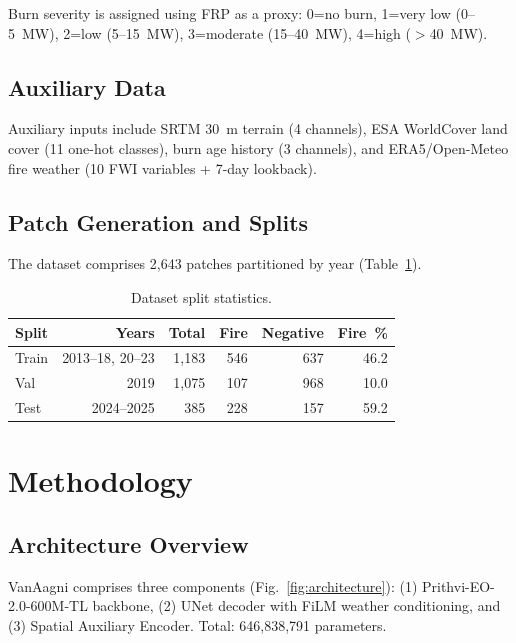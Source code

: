 \documentclass[review,12pt]{elsarticle}
\begin{document}
Burn severity is assigned using FRP as a proxy: 0=no burn, 1=very low (0--5~MW), 2=low (5--15~MW), 3=moderate (15--40~MW), 4=high ($>$40~MW).

\subsection{Auxiliary Data}

Auxiliary inputs include SRTM 30~m terrain (4 channels), ESA WorldCover land cover (11 one-hot classes), burn age history (3 channels), and ERA5/Open-Meteo fire weather (10 FWI variables + 7-day lookback).

\subsection{Patch Generation and Splits}

The dataset comprises 2,643 patches partitioned by year (Table~\ref{tab:splits}).

\begin{table}[htbp]
  \centering
  \caption{Dataset split statistics.}
  \label{tab:splits}
  \begin{tabular}{lrrrrr}
    \toprule
    Split & Years & Total & Fire & Negative & Fire~\% \\
    \midrule
    Train & 2013--18, 20--23 & 1,183 & 546 & 637 & 46.2 \\
    Val & 2019 & 1,075 & 107 & 968 & 10.0 \\
    Test & 2024--2025 & 385 & 228 & 157 & 59.2 \\
    \bottomrule
  \end{tabular}
\end{table}


\section{Methodology}
\label{sec:method}

\subsection{Architecture Overview}

VanAagni comprises three components (Fig.~\ref{fig:architecture}): (1) Prithvi-EO-2.0-600M-TL backbone, (2) UNet decoder with FiLM weather conditioning, and (3) Spatial Auxiliary Encoder. Total: 646,838,791 parameters.
\end{document}
